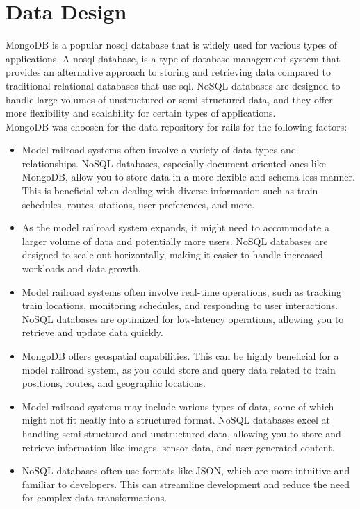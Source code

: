 \chapter{Data Design}
MongoDB is a popular \gls{nosql} database that is widely used for various types of applications. A \gls{nosql} database, is a type of database management system that provides an alternative approach to storing and retrieving data compared to traditional relational databases that use \gls{sql}. NoSQL databases are designed to handle large volumes of unstructured or semi-structured data, and they offer more flexibility and scalability for certain types of applications.\vspace{5mm} \\
MongoDB was choosen for the data repository for \gls{rails} for the following factors:
\begin{itemize}
\item  Model railroad systems often involve a variety of data types and relationships. NoSQL databases, especially document-oriented ones like MongoDB, allow you to store data in a more flexible and schema-less manner. This is beneficial when dealing with diverse information such as train schedules, routes, stations, user preferences, and more.
\item  As the model railroad system expands, it might need to accommodate a larger volume of data and potentially more users. NoSQL databases are designed to scale out horizontally, making it easier to handle increased workloads and data growth.
\item  Model railroad systems often involve real-time operations, such as tracking train locations, monitoring schedules, and responding to user interactions. NoSQL databases are optimized for low-latency operations, allowing you to retrieve and update data quickly.
\item  MongoDB offers geospatial capabilities. This can be highly beneficial for a model railroad system, as you could store and query data related to train positions, routes, and geographic locations.
\item  Model railroad systems may include various types of data, some of which might not fit neatly into a structured format. NoSQL databases excel at handling semi-structured and unstructured data, allowing you to store and retrieve information like images, sensor data, and user-generated content.
\item  NoSQL databases often use formats like JSON, which are more intuitive and familiar to developers. This can streamline development and reduce the need for complex data transformations.

\end{itemize}
